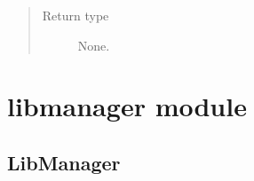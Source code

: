 \documentclass[letterpaper,10pt,english]{sphinxmanual}
\begin{document}
\begin{fulllineitems}
\begin{fulllineitems}
\begin{quote}
\begin{description}
\item[{Return type}] \leavevmode
None.

\end{description}\end{quote}

\end{fulllineitems}


\end{fulllineitems}



\section{libmanager module}
\label{\detokenize{api/initobjects:libmanager-module}}

\subsection{LibManager}
\label{\detokenize{api/initobjects:libmanager}}\label{\detokenize{api/initobjects:libmanagerob}}
\end{document}
